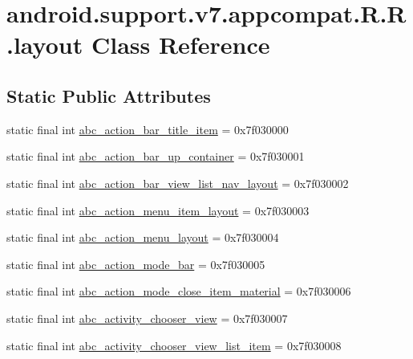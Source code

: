 \hypertarget{classandroid_1_1support_1_1v7_1_1appcompat_1_1_r_1_1layout}{
\section{android.support.v7.appcompat.R.R.layout Class Reference}
\label{classandroid_1_1support_1_1v7_1_1appcompat_1_1_r_1_1layout}
}
\subsection*{Static Public Attributes}
\begin{CompactItemize}
\item 
static final int \hyperlink{classandroid_1_1support_1_1v7_1_1appcompat_1_1_r_1_1layout_1bb1b36280aaca51428b7dc731cc0035}{abc\_\-action\_\-bar\_\-title\_\-item} = 0x7f030000
\item 
static final int \hyperlink{classandroid_1_1support_1_1v7_1_1appcompat_1_1_r_1_1layout_50c1266e2978fc2d78056776f58f35f8}{abc\_\-action\_\-bar\_\-up\_\-container} = 0x7f030001
\item 
static final int \hyperlink{classandroid_1_1support_1_1v7_1_1appcompat_1_1_r_1_1layout_ef9c88517fa89d5a94a45e002fa4c15c}{abc\_\-action\_\-bar\_\-view\_\-list\_\-nav\_\-layout} = 0x7f030002
\item 
static final int \hyperlink{classandroid_1_1support_1_1v7_1_1appcompat_1_1_r_1_1layout_2526def09e5668ade95337939a7ddfbb}{abc\_\-action\_\-menu\_\-item\_\-layout} = 0x7f030003
\item 
static final int \hyperlink{classandroid_1_1support_1_1v7_1_1appcompat_1_1_r_1_1layout_481a91b8176b785fdf09610be2c7d164}{abc\_\-action\_\-menu\_\-layout} = 0x7f030004
\item 
static final int \hyperlink{classandroid_1_1support_1_1v7_1_1appcompat_1_1_r_1_1layout_aa4fd307f331f3d9a5b638fed13c41dd}{abc\_\-action\_\-mode\_\-bar} = 0x7f030005
\item 
static final int \hyperlink{classandroid_1_1support_1_1v7_1_1appcompat_1_1_r_1_1layout_90ecc805a0773f2a7c39a5dc95b3a733}{abc\_\-action\_\-mode\_\-close\_\-item\_\-material} = 0x7f030006
\item 
static final int \hyperlink{classandroid_1_1support_1_1v7_1_1appcompat_1_1_r_1_1layout_7849bcce3be40598608af507481d1092}{abc\_\-activity\_\-chooser\_\-view} = 0x7f030007
\item 
static final int \hyperlink{classandroid_1_1support_1_1v7_1_1appcompat_1_1_r_1_1layout_9e06cbd31292e13dd3a1eb45280e08fa}{abc\_\-activity\_\-chooser\_\-view\_\-list\_\-item} = 0x7f030008

\end{CompactItemize}
